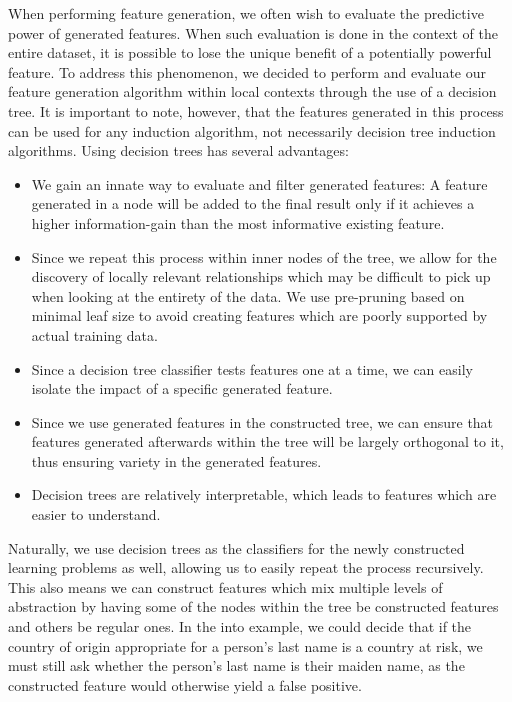 \documentclass{article}
\theoremstyle{definition}
\begin{document}
When performing feature generation, we often wish to evaluate the predictive power of generated features. When such evaluation is done in the context of the entire dataset, it is possible to lose the unique benefit of a potentially powerful feature. To address this phenomenon, we decided to perform and evaluate our feature generation algorithm within local contexts through the use of a decision tree. It is important to note, however, that the features generated in this process can be used for any induction algorithm, not necessarily decision tree induction algorithms.
Using decision trees has several advantages: 
\begin{itemize}
	\item We gain an innate way to evaluate and filter generated features: A feature generated in a node will be added to the final result only if it achieves a higher information-gain than the most informative existing feature. %
	\item Since we repeat this process within inner nodes of the tree, we allow for the discovery of locally relevant relationships which may be difficult to pick up when looking at the entirety of the data. We use pre-pruning based on minimal leaf size to avoid creating features which are poorly supported by actual training data.
	\item Since a decision tree classifier tests features one at a time, we can easily isolate the impact of a specific generated feature.
	\item Since we use generated features in the constructed tree, we can ensure that features generated afterwards within the tree will be largely orthogonal to it, thus ensuring variety in the generated features. %
	\item Decision trees are relatively interpretable, which leads to features which are easier to understand.
\end{itemize}
Naturally, we use decision trees as the classifiers for the newly constructed learning problems as well, allowing us to easily repeat the process recursively. This also means we can construct features which mix multiple levels of abstraction by having some of the nodes within the tree be constructed features and others be regular ones. In the into example, we could decide that if the country of origin appropriate for a person's last name is a country at risk, we must still ask whether the person's last name is their maiden name, as the constructed feature would otherwise yield a false positive.
\end{document}
